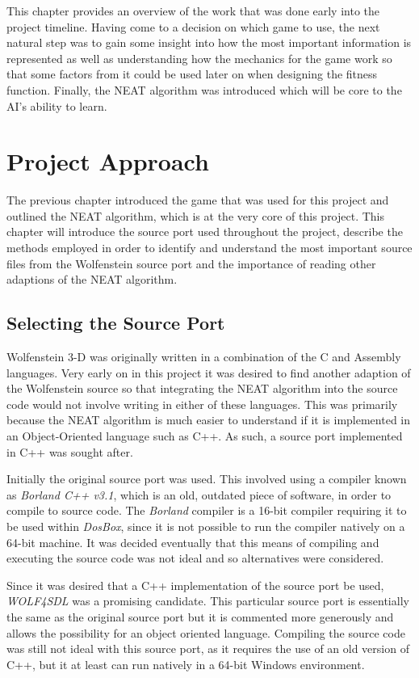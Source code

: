 \documentclass[]{Learning-to-Play-Wolfenstein-thesis}
\begin{document}
This chapter provides an overview of the work that was done early into the project timeline. Having come to a decision on which game to use, the next natural step was to gain some insight into how the most important information is represented as well as understanding how the mechanics for the game work so that some factors from it could be used later on when designing the fitness function. Finally, the NEAT algorithm was introduced which will be core to the AI's ability to learn.


\chapter{\label{Chapter3}Project Approach}%
The previous chapter introduced the game that was used for this project and outlined the NEAT algorithm, which is at the very core of this project. This chapter will introduce the source port used throughout the project, describe the methods employed in order to identify and understand the most important source files from the Wolfenstein source port and the importance of reading other adaptions of the NEAT algorithm.

\section{Selecting the Source Port}
Wolfenstein 3-D was originally written in a combination of the C and Assembly languages. Very early on in this project it was desired to find another adaption of the Wolfenstein source so that integrating the NEAT algorithm into the source code would not involve writing in either of these languages. This was primarily because the NEAT algorithm is much easier to understand if it is implemented in an Object-Oriented language such as C++. As such, a source port implemented in C++ was sought after. 

Initially the original source port was used. This involved using a compiler known as \textit{Borland C++ v3.1}, which is an old, outdated piece of software, in order to compile to source code. The \textit{Borland} compiler is a 16-bit compiler requiring it to be used within \textit{DosBox}, since it is not possible to run the compiler natively on a 64-bit machine. It was decided eventually that this means of compiling and executing the source code was not ideal and so alternatives were considered.

Since it was desired that a C++ implementation of the source port be used, \textit{WOLF4SDL} was a promising candidate. This particular source port is essentially the same as the original source port but it is commented more generously and allows the possibility for an object oriented language. Compiling the source code was still not ideal with this source port, as it requires the use of an old version of C++, but it at least can run natively in a 64-bit Windows environment.  
\end{document}

